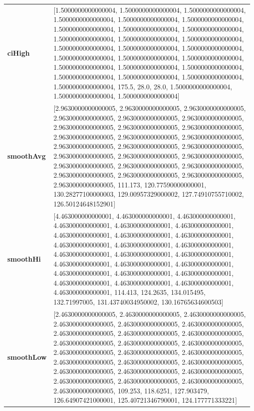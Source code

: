 						\begin{table}[H]
							\centering
							\begin{tabularx}{\textwidth}{lX}
		\textbf{ciHigh}& [1.5000000000000004, 1.5000000000000004, 1.5000000000000004, 1.5000000000000004, 1.5000000000000004, 1.5000000000000004, 1.5000000000000004, 1.5000000000000004, 1.5000000000000004, 1.5000000000000004, 1.5000000000000004, 1.5000000000000004, 1.5000000000000004, 1.5000000000000004, 1.5000000000000004, 1.5000000000000004, 1.5000000000000004, 1.5000000000000004, 1.5000000000000004, 1.5000000000000004, 1.5000000000000004, 1.5000000000000004, 1.5000000000000004, 1.5000000000000004, 1.5000000000000004, 175.5, 28.0, 28.0, 1.5000000000000004, 1.5000000000000004, 1.5000000000000004]\\ 
		\textbf{smoothAvg}&  [2.9630000000000005, 2.9630000000000005, 2.9630000000000005, 2.9630000000000005, 2.9630000000000005, 2.9630000000000005, 2.9630000000000005, 2.9630000000000005, 2.9630000000000005, 2.9630000000000005, 2.9630000000000005, 2.9630000000000005, 2.9630000000000005, 2.9630000000000005, 2.9630000000000005, 2.9630000000000005, 2.9630000000000005, 2.9630000000000005, 2.9630000000000005, 2.9630000000000005, 2.9630000000000005, 2.9630000000000005, 2.9630000000000005, 2.9630000000000005, 2.9630000000000005, 111.173, 120.77590000000001, 130.28277100000003, 129.00957329000002, 127.74910755710002, 126.50124648152901] \\
		\textbf{smoothHi}& [4.463000000000001, 4.463000000000001, 4.463000000000001, 4.463000000000001, 4.463000000000001, 4.463000000000001, 4.463000000000001, 4.463000000000001, 4.463000000000001, 4.463000000000001, 4.463000000000001, 4.463000000000001, 4.463000000000001, 4.463000000000001, 4.463000000000001, 4.463000000000001, 4.463000000000001, 4.463000000000001, 4.463000000000001, 4.463000000000001, 4.463000000000001, 4.463000000000001, 4.463000000000001, 4.463000000000001, 4.463000000000001, 114.413, 124.2635, 134.015495, 132.71997005, 131.43740034950002, 130.16765634600503] \\
		\textbf{smoothLow} &[2.4630000000000005, 2.4630000000000005, 2.4630000000000005, 2.4630000000000005, 2.4630000000000005, 2.4630000000000005, 2.4630000000000005, 2.4630000000000005, 2.4630000000000005, 2.4630000000000005, 2.4630000000000005, 2.4630000000000005, 2.4630000000000005, 2.4630000000000005, 2.4630000000000005, 2.4630000000000005, 2.4630000000000005, 2.4630000000000005, 2.4630000000000005, 2.4630000000000005, 2.4630000000000005, 2.4630000000000005, 2.4630000000000005, 2.4630000000000005, 2.4630000000000005, 109.253, 118.6251, 127.903479, 126.64907421000001, 125.40721346790001, 124.177771333221]\\
		
	\end{tabularx} 
\end{table}

